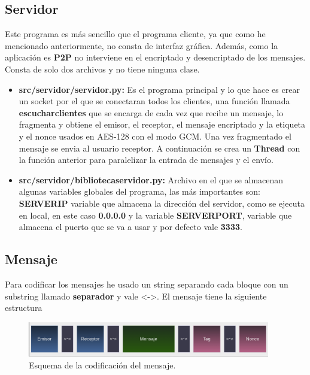 \subsection{Servidor}
Este programa es más sencillo que el programa cliente, ya que como he mencionado anteriormente, no consta de interfaz gráfica. Además, como la aplicación es \textbf{P2P} no interviene en el encriptado y desencriptado de los mensajes. Consta de solo dos archivos y no tiene ninguna clase.
\begin{itemize}
	\item \textbf{src/servidor/servidor.py:} Es el programa principal y lo que hace es crear un socket por el que se conectaran todos los clientes, una función llamada \textbf{escuchar\textunderscore clientes} que se encarga de cada vez que recibe un mensaje, lo fragmenta y obtiene el emisor, el receptor, el mensaje encriptado y la etiqueta y el nonce usados en AES-128 con el modo GCM. Una vez fragmentado el mensaje se envia al usuario receptor. A continuación se crea un \textbf{Thread} con la función anterior para paralelizar la entrada de mensajes y el envío.
	\item \textbf{src/servidor/biblioteca\textunderscore servidor.py:} Archivo en el que se almacenan algunas variables globales del programa, las más importantes son: \textbf{SERVER\textunderscore IP} variable que almacena la dirección del servidor, como se ejecuta en local, en este caso \textbf{0.0.0.0} y la variable \textbf{SERVER\textunderscore PORT}, variable que almacena el puerto que se va a usar y por defecto vale \textbf{3333}.
\end{itemize}

\subsection{Mensaje}
Para codificar los mensajes he usado un string separando cada bloque con un substring llamado \textbf{separador} y vale \textless-\textgreater. El mensaje tiene la siguiente estructura

\begin{figure}[htb]
	\centering
	\includegraphics[width=400]{imagenes/mensaje_app.png} 
	\caption{Esquema de la codificación del mensaje.}
	\label{mensajeapp}
\end{figure}

